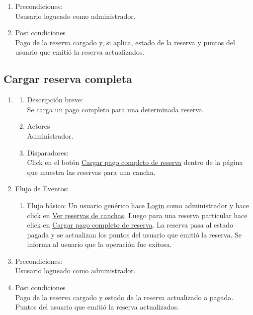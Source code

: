 \documentclass[a4paper,11pt]{article}
\begin{document}
\begin{enumerate}
\begin{enumerate}
    \end{enumerate}

    \item Precondiciones: \\
        Ususario logueado como administrador.

    \item Post condiciones \\
        Pago de la reserva cargado y, si aplica, estado de la reserva y puntos
        del usuario que emitió la reserva actualizados.

\end{enumerate}

\subsection{Cargar reserva completa}
\begin{enumerate}

    \item
    \begin{enumerate}
    \item Descripción breve: \\
        Se carga un pago completo para una determinada reserva.
    \item Actores \\
        Administrador.
    \item Disparadores: \\
        Click en el botón \underline{Cargar pago completo de reserva} dentro
        de la página que muestra las reservas para una cancha.
    \end{enumerate}

    \item Flujo de Eventos:

    \begin{enumerate}

        \item Flujo básico:
            Un usuario genérico hace \underline{Login} como administrador y
            hace click en \underline{Ver reservas de canchas}. Luego para una
            reserva particular hace click en
            \underline{Cargar pago completo de reserva}. La reserva pasa al
            estado pagada y se actualizan los puntos del usuario que emitió la
            reserva. Se informa al usuario que la operación fue exitosa.

    \end{enumerate}

    \item Precondiciones: \\
        Ususario logueado como administrador.

    \item Post condiciones \\
        Pago de la reserva cargado y estado de la reserva actualizado a pagada.
        Puntos del usuario que emitió la reserva actualizados.

\end{enumerate}
\end{document}
